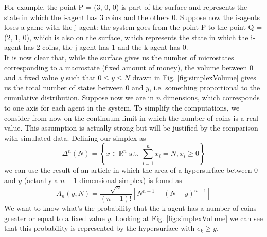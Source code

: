 For example, the point P = (3, 0, 0) is part of the surface and represents the state in which the i-agent has 3 coins and the others 0.
Suppose now the i-agents loses a game with the j-agent: the system goes from the point P to the point Q = (2, 1, 0), which is also on the surface, which represents the state in which the i-agent has 2 coins, the j-agent has 1 and the k-agent has 0.
\\It is now clear that, while the surface gives us the number of microstates corresponding to a macrostate (fixed amount of money), the volume between 0 and a fixed value $y$ such that $0 \leq y \leq N$ drawn in Fig. \ref{fig:simplexVolume} gives us the total number of states between 0 and $y$, i.e. something proportional to the cumulative distribution.
Suppose now we are in $n$ dimensions, which corresponds to one axis for each agent in the system.
To simplify the computations, we consider from now on the continuum limit in which the number of coins is a real value.
This assumption is actually strong but will be justified by the comparison with simulated data. 
Defining our simplex as
\begin{equation*}
    \Delta^n(N)=\left\{x \in \mathbb{R}^n \text{ s.t. } \sum_{i = 1}^n x_i = N, x_i \geq 0\right\}
\end{equation*}
we can use the result of an article \cite{simplexSampling} in which the area of a hypersurface between 0 and $y$ (actually a $n-1$ dimensional simplex) is found as
\begin{equation*}
    A_n\left(y, N\right) = \frac{\sqrt{n}}{\left(n-1\right)!}\left[N^{n-1} - \left(N - y\right)^{n-1}\right]
\end{equation*}
We want to know what's the probability that the k-agent has a number of coins greater or equal to a fixed value $y$.
Looking at Fig. \ref{fig:simplexVolume} we can see that this probability is represented by the hypersurface with $e_k \geq y$. 
